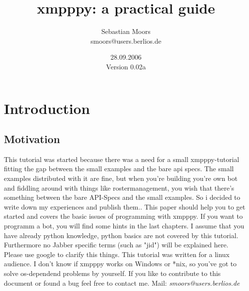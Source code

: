 \documentclass[a4paper,10pt]{report}
\title{xmpppy: a practical guide}
\author{Sebastian Moors \\ smoors@users.berlios.de}
\date{28.09.2006 \\[1cm] Version 0.02a}
\begin{document}
\begin{titlepage}
\maketitle


\end{titlepage}
\tableofcontents
\newpage




\chapter{Introduction}
\section{Motivation}
This tutorial was started because there was a need for a small xmpppy-tutorial fitting the gap between the small examples and the bare api specs. The small examples distributed with it are fine, but when you're building you're own bot and fiddling around with things like rostermanagement, you wish that there's something between the bare API-Specs and the small examples. So i decided to write down my experiences and publish them..
\newline
This paper should help you to get started and covers the basic issues of programming with xmpppy.
If you want to programm a bot, you will find some hints in the last chapters.
I assume that you have already python knowledge, python basics are not covered by this tutorial.
\newline
\newline
Furthermore no Jabber specific terms (such as "jid") will be explained here. Please use google to clarify this things.
\newline
\newline
This tutorial was written for a linux audience. I don't know if xmpppy works on Windows or *nix, so you've got to solve os-dependend problems by yourself.
\newline
\newline
If you like to contribute to this document or found a bug feel free to contact me.
\newline
\newline Mail: \textit{smoors@users.berlios.de}
\end{document}
